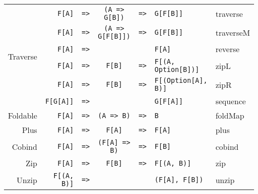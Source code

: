 \documentclass{tufte-handout}
\newcommand{\fa}{\texttt{F[A]}}
\newcommand{\fb}{\texttt{F[B]}}
\newcommand{\rarr}{\texttt{=>}}
\begin{document}
\begin{table}[ht]
\begin{tabular}{rrcclll}
    \multirow{6}{*}{Traverse} & \fa & \rarr & \texttt{(A => G[B])} & \rarr & \texttt{G[F[B]]} & traverse \\
                  & \fa & \rarr & \texttt{(A => G[F[B]])} & \rarr & \texttt{G[F[B]]} & traverseM \\
                  & \fa & \rarr & & & \fa & reverse \\
                  & \fa & \rarr & \fb & \rarr & \texttt{F[(A, Option[B])]} & zipL \\
                  & \fa & \rarr & \fb & \rarr & \texttt{F[(Option[A], B)]} & zipR \\
                  & \texttt{F[G[A]]} & \rarr & & & \texttt{G[F[A]]} & sequence \\[.5cm]
    Foldable      & \fa & \rarr & \texttt{(A => B)} & \rarr & \texttt{B} & foldMap \\[.5cm]
    Plus          & \fa & \rarr & \fa & \rarr & \fa & plus \\[.5cm]
    Cobind        & \fa & \rarr & \texttt{(F[A] => B)} & \rarr & \fb & cobind \\[.5cm]
    Zip           & \fa & \rarr & \fb & \rarr & \texttt{F[(A, B)]} & zip \\[.5cm]
    Unzip         & \texttt{F[(A, B)]} & \rarr & & & \texttt{(F[A], F[B])} & unzip \\
  \end{tabular}
\end{table}
\end{document}
